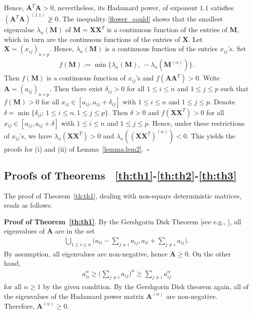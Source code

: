 \documentclass[conference,letterpaper]{IEEEtran}
\numberwithin{equation}{section}
\newcommand{\lbl}{\label}
\newcommand{\beaa}{\begin{eqnarray*}}
\newcommand{\eeaa}{\end{eqnarray*}}
\newcommand{\bea}{\begin{eqnarray}}
\newcommand{\eea}{\end{eqnarray}}
\begin{document}
Hence, $\mathbf{A}^T\mathbf{A}>0$, nevertheless, its Hadamard power, of exponent $1.1$ satisfies $(\mathbf{A}^T\mathbf{A})^{(1.1)} \ngeqslant 0$.
The inequality \eqref{flower_could} shows that the smallest eigenvalue $\lambda_n(\mathbf{M})$ of $\mathbf{M}=\mathbf{X}\mathbf{X}^T$ is a continuous function of the entries of $\mathbf{M}$, which in turn are the continuous functions of the entries of $\mathbf{X}$. 
Let $\mathbf{X}=(x_{ij})_{n\times p}$.
Hence, $\lambda_n(\mathbf{M})$ is a continuous function of the entries $x_{ij}$'s. 
Set
 \beaa
f(\mathbf{M}):=\min\big\{\lambda_n(\mathbf{M}),\, -\lambda_n(\mathbf{M}^{(\alpha)})\big\}.
\eeaa
Then $f(\mathbf{M})$ is a continuous function of $x_{ij}$'s and $f(\mathbf{A}\mathbf{A}^T)>0.$ Write  $\mathbf{A}=(a_{ij})_{n\times p}$. Then there exist $\delta_{ij}>0$ for all $1\leq i\leq n$ and $1\leq j \leq p$ such that $f(\mathbf{M})>0$ for all $x_{ij}\in [a_{ij}, a_{ij}+\delta_{ij}]$ with $1\leq i\leq n$ and $1\leq j \leq p$. Denote $\delta=\min\{\delta_{ij};\, 1\leq i\leq n, 1\leq j \leq p\}.$ Then $\delta>0$ and $f(\mathbf{X}\mathbf{X}^T)>0$ for all $x_{ij}\in [a_{ij}, a_{ij}+\delta]$ with $1\leq i\leq n$ and $1\leq j \leq p$. Hence, under these restrictions of $x_{ij}$'s, we have $\lambda_n(\mathbf{X}\mathbf{X}^T)>0$ and $\lambda_n((\mathbf{X}\mathbf{X}^T)^{(\alpha)}) < 0$. This yields the proofs for (i) and (ii) of Lemma~\ref{lemma:lem2}.~\hfill$\square$

\medskip


\subsection{Proofs of Theorems ~\ref{th:th1}-\ref{th:th2}-\ref{th:th3}}
The proof of Theorem~\ref{th:th1}, dealing with non-square deterministic matrices, reads as follows:

\noindent\textbf{Proof of Theorem~\ref{th:th1}}. 
By the Gershgorin Disk Theorem [see e.g., \cite{horn1985}], all eigenvalues of $\mathbf{A}$ are in the set
\bea\lbl{bro_pro}
\bigcup_{1\leq i \leq n}\Big(a_{ii}- \sum_{j\ne i}a_{ij}, a_{ii}+ \sum_{j\ne i}a_{ij}\Big).
\eea
By assumption, all eigenvalues are non-negative, hence $\mathbf{A}\geq 0$. On the other hand,
\beaa
a_{ii}^{\alpha}\geq  \Big(\sum_{j\ne i}a_{ij}\Big)^{\alpha}\geq \sum_{j\ne i}a_{ij}^{\alpha}
\eeaa
for all $\alpha\geq 1$ by the given condition. By the Gershgorin Disk theorem again, all of the eigenvalues of the Hadamard power matrix $\mathbf{A}^{(\alpha)}$ are non-negative. Therefore,  $\mathbf{A}^{(\alpha)}\geq  0$.
\end{document}
